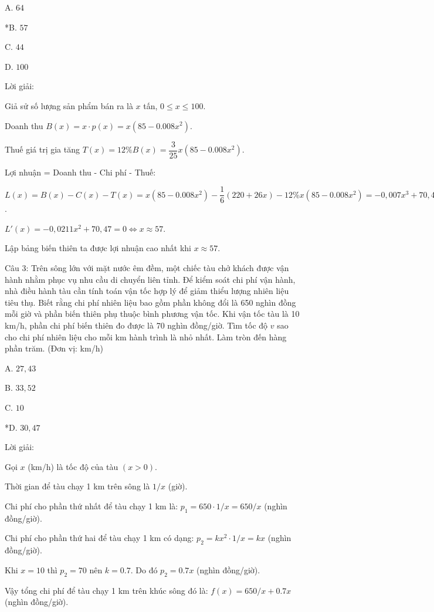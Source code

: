 \documentclass[a4paper,12pt]{article}
\begin{document}
A. \(64\)

*B. \(57\)

C. \(44\)

D. \(100\)

Lời giải:


Giả sử số lượng sản phẩm bán ra là \(x\) tấn, \(0 \leq x \leq 100\).

Doanh thu \(B(x) = x \cdot p(x) = x(85 - 0.008x^2)\).

Thuế giá trị gia tăng \(T(x) = 12\% B(x) = \dfrac{3}{25} x(85 - 0.008x^2)\).

Lợi nhuận = Doanh thu - Chi phí - Thuế:

\(L(x) = B(x) - C(x) - T(x) = x(85 - 0.008x^2) - \dfrac{1}{6}(220 + 26x) - 12\% x(85 - 0.008x^2) = -0,007x^3 + 70,47x + -36,67\).

\(L'(x) = -0,0211x^2 + 70,47 = 0 \Leftrightarrow x \approx 57\).

Lập bảng biến thiên ta được lợi nhuận cao nhất khi \(x \approx 57\).




Câu 3: Trên sông lớn với mặt nước êm đềm, một chiếc tàu chở khách được vận hành nhằm phục vụ nhu cầu di chuyển liên tỉnh. Để kiểm soát chi phí vận hành, nhà điều hành tàu cần tính toán vận tốc hợp lý để giảm thiểu lượng nhiên liệu tiêu thụ. Biết rằng chi phí nhiên liệu bao gồm phần không đổi là 650 nghìn đồng mỗi giờ và phần biến thiên phụ thuộc bình phương vận tốc. Khi vận tốc tàu là 10 km/h, phần chi phí biến thiên đo được là 70 nghìn đồng/giờ. Tìm tốc độ \(v\) sao cho chi phí nhiên liệu cho mỗi km hành trình là nhỏ nhất. Làm tròn đến hàng phần trăm. (Đơn vị: km/h)

A. \(27,43\)

B. \(33,52\)

C. \(10\)

*D. \(30,47\)

Lời giải:


Gọi \(x\) (km/h) là tốc độ của tàu \((x > 0)\).

Thời gian để tàu chạy 1 km trên sông là \(1/x\) (giờ).

Chi phí cho phần thứ nhất để tàu chạy 1 km là: \(p_1=650 \cdot 1/x=650/x\) (nghìn đồng/giờ).

Chi phí cho phần thứ hai để tàu chạy 1 km có dạng: \(p_2=k x^2 \cdot 1/x=k x\) (nghìn đồng/giờ).

Khi \(x=10\) thì \(p_2=70\) nên \(k=0.7\). Do đó \(p_2=0.7 x\) (nghìn đồng/giờ).

Vậy tổng chi phí để tàu chạy 1 km trên khúc sông đó là: \(f(x)=650/x+0.7 x\) (nghìn đồng/giờ).
\end{document}
